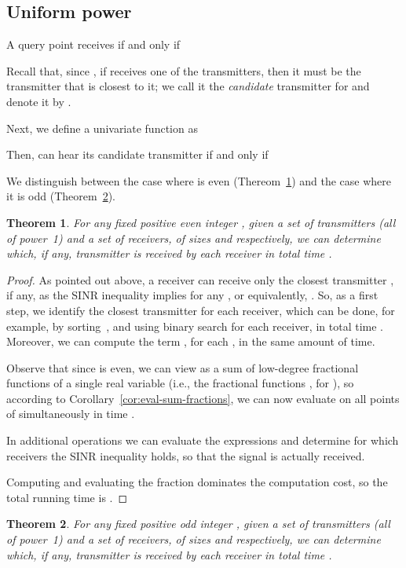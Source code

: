 \documentclass[11pt]{article}
\newtheorem{theorem}{Theorem}[section]
\theoremstyle{remark}
\begin{document}
\subsection{Uniform power}
\label{sec:1d-uni}

A query point  receives  if and only if

Recall that, since , if  receives one of the transmitters, then it must be the transmitter that is closest to it; we call it the \emph{candidate} transmitter for  and denote it by .


Next, we define a univariate function  as

Then,  can hear its candidate transmitter  if and only if 

We distinguish between the case where  is even (Thereom~\ref{th:1d-batch-uniform}) and the case where it is odd (Theorem~\ref{th:1d-batch-uniform-odd}).
\begin{theorem}
  \label{th:1d-batch-uniform}
  For any fixed positive even integer , given a set  of
  transmitters (all of power~1) and a set  of receivers, of sizes
   and  respectively, we can determine which, if any,
  transmitter is received by each receiver in total time .
\end{theorem}

\begin{proof}
  As pointed out above, a receiver  can receive only the closest
  transmitter , if any, as the SINR inequality implies
   for any , or
  equivalently, .  So, as a
  first step, we identify the closest transmitter for each receiver,
  which can be done, for example, by sorting~, and using binary search for each
  receiver, in total time .  Moreover, we can compute
  the term , for each , in the same 
  amount of time.

  Observe that since  is even, we can view
   as a sum of  low-degree fractional functions of a single real variable  (i.e., the fractional functions , for ), so 
according to Corollary~\ref{cor:eval-sum-fractions}, we can now
evaluate  on all points of  simultaneously in time .  

  In  additional operations we can evaluate the expressions
   and determine for which receivers the SINR
  inequality holds, so that the signal is actually received.

  Computing and evaluating the fraction dominates the computation cost, so the
  total running time is .
\end{proof}

\begin{theorem}
  \label{th:1d-batch-uniform-odd}
  For any fixed positive odd integer , given a set  of
  transmitters (all of power~1) and a set 
  of receivers, of sizes  and  respectively, we can determine
  which, if any, transmitter is received by each receiver in total
  time .
\end{theorem}
\end{document}
